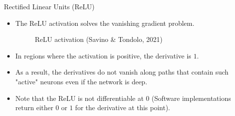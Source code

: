 \begin{frame} {Rectified Linear Units (ReLU)}
  \begin{itemize}
    \item The ReLU activation solves the vanishing gradient problem.
    \begin{figure}
      \centering
        \caption{ReLU activation (Savino \& Tondolo, 2021)}
    \end{figure}
    \item In regions where the activation is positive, the derivative is $1$. 
    \item As a result, the derivatives do not vanish along paths that contain such "active" neurons even if the network is deep.
    \item Note that the ReLU is not differentiable at 0 (Software implementations return either $0$ or $1$ for the derivative at this point).
  \end{itemize}
\end{frame}

